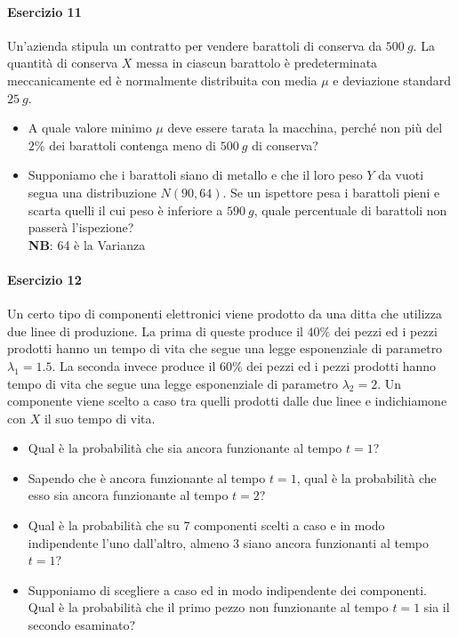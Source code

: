 \documentclass[12pt]{article}
\begin{document}
    \paragraph{Esercizio 11}
    Un'azienda stipula un contratto per vendere barattoli di conserva da $500 \ g$. La quantità di conserva $X$ messa in ciascun barattolo è predeterminata meccanicamente ed è normalmente distribuita con media $\mu$ e deviazione standard $25 \ g$.
    \begin{itemize}
        \item A quale valore minimo $\mu$ deve essere tarata la macchina, perché non più del $2\%$ dei barattoli contenga meno di $500 \ g$ di conserva?
        \item Supponiamo che i barattoli siano di metallo e che il loro peso $Y$ da vuoti segua una distribuzione $N(90,64)$. Se un ispettore pesa i barattoli pieni e scarta quelli il cui peso è inferiore a $590 \ g$, quale percentuale di barattoli non passerà l'ispezione? \\ \textbf{NB}: 64 è la Varianza 
    \end{itemize}
    \paragraph{Esercizio 12}
    Un certo tipo di componenti elettronici viene prodotto da una ditta che utilizza due linee di produzione. La prima di queste produce il $40\%$ dei pezzi ed i pezzi prodotti hanno un tempo di vita che segue una legge esponenziale di parametro $\lambda_1=1.5$. La seconda invece produce il $60\%$ dei pezzi ed i pezzi prodotti hanno tempo di vita che segue una legge esponenziale di parametro $\lambda_2=2$. Un componente viene scelto a caso tra quelli prodotti dalle due linee e indichiamone con $X$ il suo tempo di vita.
    \begin{itemize}
        \item Qual è la probabilità che sia ancora funzionante al tempo $t=1$?
        \item Sapendo che è ancora funzionante al tempo $t=1$, qual è la probabilità che esso sia ancora funzionante al tempo $t=2$?
        \item Qual è la probabilità che su 7 componenti scelti a caso e in modo indipendente l’uno dall’altro, almeno 3 siano ancora funzionanti al tempo $t=1$?
        \item Supponiamo di scegliere a caso ed in modo indipendente dei componenti. Qual è la probabilità che il primo pezzo non funzionante al tempo $t=1$ sia il secondo esaminato?
    \end{itemize}
    \newpage
\end{document}
